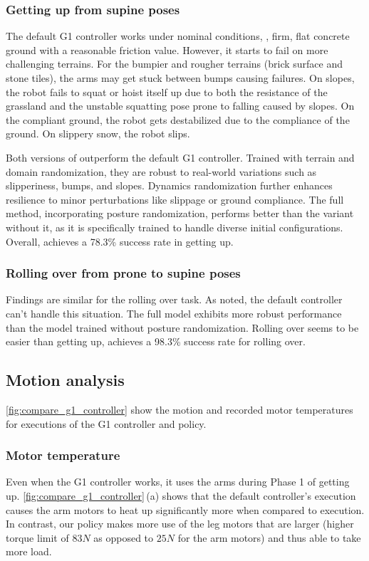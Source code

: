 \subsubsection{Getting up from supine poses} 
The default G1 controller works under nominal conditions, \ie, firm, flat concrete ground with a reasonable friction value. 
However, it starts to fail on more challenging terrains. 
For the bumpier and rougher terrains (brick surface and stone tiles), the arms may get stuck between bumps causing failures. 
On slopes, the robot fails to squat or hoist itself up due to both the resistance of the grassland and the unstable squatting pose prone to falling caused by slopes.
On the compliant ground, the robot gets destabilized due to the compliance of the ground. 
On slippery snow, the robot slips. 


Both versions of \ours outperform the default G1 controller. Trained with terrain and domain randomization, they are robust to real-world variations such as slipperiness, bumps, and slopes. Dynamics randomization further enhances resilience to minor perturbations like slippage or ground compliance. The full method, incorporating posture randomization, performs better than the variant without it, as it is specifically trained to handle diverse initial configurations. Overall, \ours achieves a 78.3\% success rate in getting up.


\subsubsection{Rolling over from prone to supine poses} Findings are similar for the rolling over task. As noted, the default controller can't handle this situation. The full model exhibits more robust performance than the model trained without posture randomization. Rolling over seems to be easier than getting up, \ours achieves a 98.3\% success rate for rolling over. 


\subsection{Motion analysis}
\cref{fig:compare_g1_controller} show the motion and recorded motor temperatures for executions of the G1 controller and \ours policy.

\subsubsection{Motor temperature}
Even when the G1 controller works, it uses the arms during Phase 1 of getting up.
\cref{fig:compare_g1_controller}\,(a) shows that the default controller's execution causes the arm motors to heat up significantly more when compared to \ours execution. 
In contrast, our policy makes more use of the leg motors that are larger (higher torque limit of $83N$ as opposed to $25N$ for the arm motors) and thus able to take more load. 

